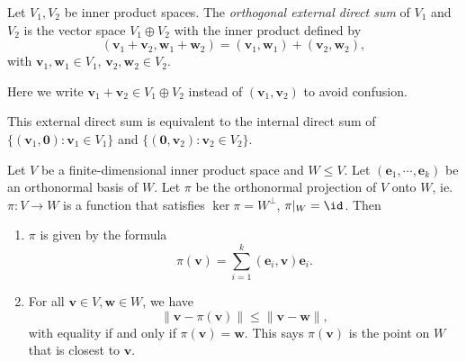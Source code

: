 \documentclass[a4paper]{article}
\begin{document}
\begin{defi}
  Let $V_1, V_2$ be inner product spaces. The \emph{orthogonal external direct sum} of $V_1$ and $V_2$ is the vector space $V_1 \oplus V_2$ with the inner product defined by
  \[
    (\mathbf{v}_1 + \mathbf{v}_2, \mathbf{w}_1 + \mathbf{w}_2) = (\mathbf{v}_1, \mathbf{w}_1) + (\mathbf{v}_2, \mathbf{w}_2),
  \]
  with $\mathbf{v}_1, \mathbf{w}_1 \in V_1$, $\mathbf{v}_2, \mathbf{w}_2 \in V_2$.

  Here we write $\mathbf{v}_1 + \mathbf{v}_2 \in V_1 \oplus V_2$ instead of $(\mathbf{v}_1, \mathbf{v}_2)$ to avoid confusion.
\end{defi}
This external direct sum is equivalent to the internal direct sum of $\{(\mathbf{v}_1, \mathbf{0}): \mathbf{v}_1 \in V_1\}$ and $\{(\mathbf{0}, \mathbf{v}_2): \mathbf{v}_2 \in V_2\}$.

\begin{prop}
  Let $V$ be a finite-dimensional inner product space and $W \leq V$. Let $(\mathbf{e}_1, \cdots, \mathbf{e}_k)$ be an orthonormal basis of $W$. Let $\pi$ be the orthonormal projection of $V$ onto $W$, ie. $\pi: V \to W$ is a function that satisfies $\ker \pi = W^\perp$, $\pi|_W = \id$. Then
  \begin{enumerate}
    \item $\pi$ is given by the formula
      \[
        \pi(\mathbf{v}) = \sum_{i = 1}^k (\mathbf{e}_i, \mathbf{v}) \mathbf{e}_i.
      \]
    \item For all $\mathbf{v}\in V, \mathbf{w} \in W$, we have
      \[
        \|\mathbf{v} - \pi(\mathbf{v})\| \leq \|\mathbf{v} - \mathbf{w}\|,
      \]
      with equality if and only if $\pi(\mathbf{v}) = \mathbf{w}$. This says $\pi(\mathbf{v})$ is the point on $W$ that is closest to $\mathbf{v}$.
      \begin{center}
      \end{center}
  \end{enumerate}
\end{prop}
\end{document}
